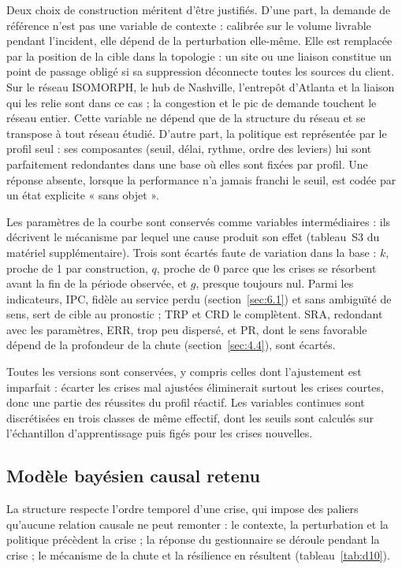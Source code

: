 Deux choix de construction méritent d'être justifiés. D'une part, la demande de référence n'est pas une variable de contexte : calibrée sur le volume livrable pendant l'incident, elle dépend de la perturbation elle-même. Elle est remplacée par la position de la cible dans la topologie : un site ou une liaison constitue un point de passage obligé si sa suppression déconnecte toutes les sources du client. Sur le réseau ISOMORPH, le hub de Nashville, l'entrepôt d'Atlanta et la liaison qui les relie sont dans ce cas ; la congestion et le pic de demande touchent le réseau entier. Cette variable ne dépend que de la structure du réseau et se transpose à tout réseau étudié. D'autre part, la politique est représentée par le profil seul : ses composantes (seuil, délai, rythme, ordre des leviers) lui sont parfaitement redondantes dans une base où elles sont fixées par profil. Une réponse absente, lorsque la performance n'a jamais franchi le seuil, est codée par un état explicite « sans objet ».

Les paramètres de la courbe sont conservés comme variables intermédiaires : ils décrivent le mécanisme par lequel une cause produit son effet (tableau~S3 du matériel supplémentaire). Trois sont écartés faute de variation dans la base : $k$, proche de 1 par construction, $q$, proche de 0 parce que les crises se résorbent avant la fin de la période observée, et $g$, presque toujours nul. Parmi les indicateurs, IPC, fidèle au service perdu (section~\ref{sec:6.1}) et sans ambiguïté de sens, sert de cible au pronostic ; TRP et CRD le complètent. SRA, redondant avec les paramètres, ERR, trop peu dispersé, et PR, dont le sens favorable dépend de la profondeur de la chute (section~\ref{sec:4.4}), sont écartés.

Toutes les versions sont conservées, y compris celles dont l'ajustement est imparfait : écarter les crises mal ajustées éliminerait surtout les crises courtes, donc une partie des réussites du profil réactif. Les variables continues sont discrétisées en trois classes de même effectif, dont les seuils sont calculés sur l'échantillon d'apprentissage puis figés pour les crises nouvelles.

\subsection{Modèle bayésien causal retenu}
\label{sec:5.2}

La structure respecte l'ordre temporel d'une crise, qui impose des paliers qu'aucune relation causale ne peut remonter : le contexte, la perturbation et la politique précèdent la crise ; la réponse du gestionnaire se déroule pendant la crise ; le mécanisme de la chute et la résilience en résultent (tableau~\ref{tab:d10}).

